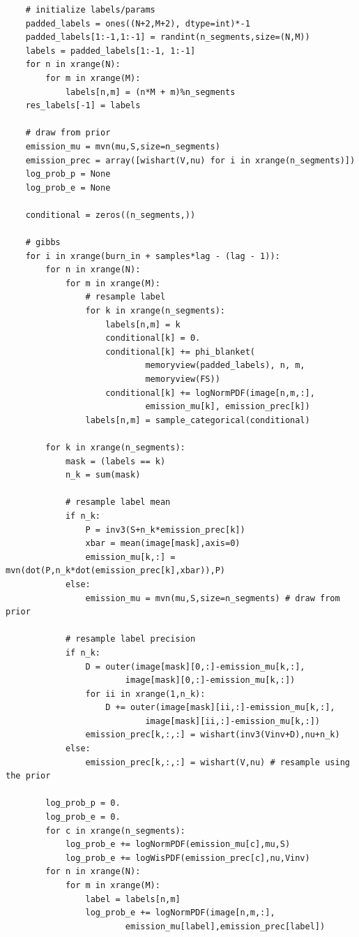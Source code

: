 \documentclass[12pt]{article}
\begin{document}
\begin{verbatim}
    # initialize labels/params
    padded_labels = ones((N+2,M+2), dtype=int)*-1
    padded_labels[1:-1,1:-1] = randint(n_segments,size=(N,M))
    labels = padded_labels[1:-1, 1:-1]
    for n in xrange(N):
        for m in xrange(M):
            labels[n,m] = (n*M + m)%n_segments
    res_labels[-1] = labels

    # draw from prior
    emission_mu = mvn(mu,S,size=n_segments)
    emission_prec = array([wishart(V,nu) for i in xrange(n_segments)])
    log_prob_p = None
    log_prob_e = None

    conditional = zeros((n_segments,))

    # gibbs
    for i in xrange(burn_in + samples*lag - (lag - 1)):
        for n in xrange(N):
            for m in xrange(M):
                # resample label
                for k in xrange(n_segments):
                    labels[n,m] = k
                    conditional[k] = 0.
                    conditional[k] += phi_blanket(
                            memoryview(padded_labels), n, m,
                            memoryview(FS))
                    conditional[k] += logNormPDF(image[n,m,:],
                            emission_mu[k], emission_prec[k])
                labels[n,m] = sample_categorical(conditional)

        for k in xrange(n_segments):
            mask = (labels == k)
            n_k = sum(mask)

            # resample label mean
            if n_k:
                P = inv3(S+n_k*emission_prec[k])
                xbar = mean(image[mask],axis=0)
                emission_mu[k,:] = mvn(dot(P,n_k*dot(emission_prec[k],xbar)),P)
            else:
                emission_mu = mvn(mu,S,size=n_segments) # draw from prior

            # resample label precision
            if n_k:
                D = outer(image[mask][0,:]-emission_mu[k,:],
                        image[mask][0,:]-emission_mu[k,:])
                for ii in xrange(1,n_k):
                    D += outer(image[mask][ii,:]-emission_mu[k,:],
                            image[mask][ii,:]-emission_mu[k,:])
                emission_prec[k,:,:] = wishart(inv3(Vinv+D),nu+n_k)
            else:
                emission_prec[k,:,:] = wishart(V,nu) # resample using the prior

        log_prob_p = 0.
        log_prob_e = 0.
        for c in xrange(n_segments):
            log_prob_e += logNormPDF(emission_mu[c],mu,S)
            log_prob_e += logWisPDF(emission_prec[c],nu,Vinv)
        for n in xrange(N):
            for m in xrange(M):
                label = labels[n,m]
                log_prob_e += logNormPDF(image[n,m,:],
                        emission_mu[label],emission_prec[label])


\end{verbatim}
\end{document}

